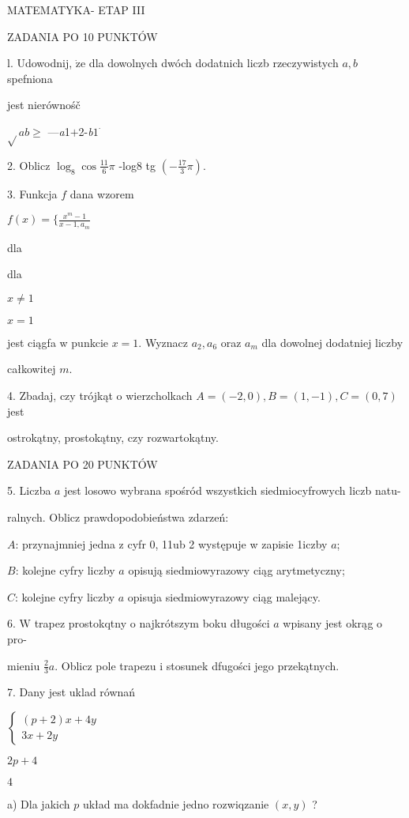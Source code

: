 \documentclass[a4paper,12pt]{article}
\begin{document}
MATEMATYKA- ETAP III

ZADANIA PO 10 PUNKTÓW

l. Udowodnij, $\dot{\mathrm{z}}\mathrm{e}$ dla dowolnych dwóch dodatnich liczb rzeczywistych $a, b$ spefniona

jest nierównośč

$\sqrt{}ab\geq$ ---{\it a}1$+$2-{\it b}$1^{\cdot}$

2. Oblicz $\displaystyle \log_{8}\cos\frac{11}{6}\pi$ -log8 tg $(-\displaystyle \frac{17}{3}\pi).$

3. Funkcja $f$ dana wzorem

$f(x)=\displaystyle \{\frac{x^{m}-1}{x-1,a_{m}}$

dla

dla

$x\neq 1$

$x=1$

jest ciągfa w punkcie $x=1$. Wyznacz $a_{2}, a_{6}$ oraz $a_{m}$ dla dowolnej dodatniej liczby

całkowitej $m.$

4. Zbadaj, czy trójkąt o wierzcholkach $A = (-2,0), B = (1,-1), C = (0,7)$ jest

ostrokątny, prostokątny, czy rozwartokątny.

ZADANIA PO 20 PUNKTÓW

5. Liczba $a$ jest losowo wybrana spośród wszystkich siedmiocyfrowych liczb natu-

ralnych. Oblicz prawdopodobieństwa zdarzeń:

$A$: przynajmniej jedna z cyfr 0, 11ub 2 występuje w zapisie 1iczby $a$;

$B$: kolejne cyfry liczby $a$ opisują siedmiowyrazowy ciąg arytmetyczny;

$C$: kolejne cyfry liczby $a$ opisuja siedmiowyrazowy ciąg malejący.

6. $\mathrm{W}$ trapez prostokqtny o najkrótszym boku długości $a$ wpisany jest okrąg o pro-

mieniu $\displaystyle \frac{2}{3}a$. Oblicz pole trapezu i stosunek dfugości jego przekątnych.

7. Dany jest uklad równań

$\left\{\begin{array}{l}
(p+2)x+4y\\
3x+2y
\end{array}\right.$

$2p+4$

$4$

a) Dla jakich $p$ układ ma dokfadnie jedno rozwiqzanie $(x,y)$ ?
\end{document}
